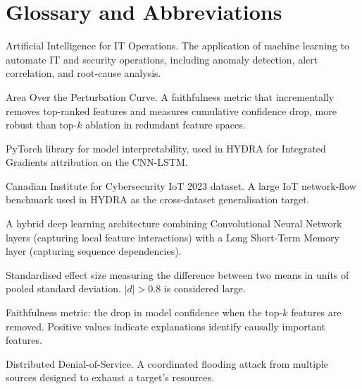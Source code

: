 \documentclass[12pt,a4paper]{report}
\begin{document}
\appendix

\chapter{Glossary and Abbreviations}
\label{app:glossary}

\begin{description}[leftmargin=2.8cm,style=nextline,itemsep=0.2em]

\item[AIOps] Artificial Intelligence for IT Operations. The application of machine learning to automate IT and security operations, including anomaly detection, alert correlation, and root-cause analysis.

\item[AOPC] Area Over the Perturbation Curve. A faithfulness metric that incrementally removes top-ranked features and measures cumulative confidence drop, more robust than top-$k$ ablation in redundant feature spaces.

\item[Captum] PyTorch library for model interpretability, used in HYDRA for Integrated Gradients attribution on the CNN-LSTM.

\item[CIC-IoT-2023] Canadian Institute for Cybersecurity IoT 2023 dataset. A large IoT network-flow benchmark used in HYDRA as the cross-dataset generalisation target.

\item[CNN-LSTM] A hybrid deep learning architecture combining Convolutional Neural Network layers (capturing local feature interactions) with a Long Short-Term Memory layer (capturing sequence dependencies).

\item[Cohen's $d$] Standardised effect size measuring the difference between two means in units of pooled standard deviation. $|d| > 0.8$ is considered large.

\item[Comprehensiveness] Faithfulness metric: the drop in model confidence when the top-$k$ features are removed. Positive values indicate explanations identify causally important features.

\item[DDoS] Distributed Denial-of-Service. A coordinated flooding attack from multiple sources designed to exhaust a target's resources.


\end{description}
\end{document}

